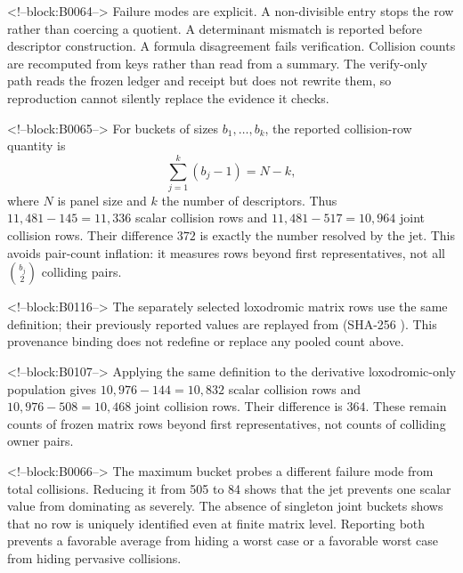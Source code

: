 \documentclass[11pt,a4paper]{article}
\theoremstyle{definition}
\theoremstyle{remark}
\begin{document}
<!--block:B0064-->
Failure modes are explicit. A non-divisible entry stops the row rather than coercing a quotient. A determinant mismatch is reported before descriptor construction. A formula disagreement fails verification. Collision counts are recomputed from keys rather than read from a summary. The verify-only path reads the frozen ledger and receipt but does not rewrite them, so reproduction cannot silently replace the evidence it checks.

<!--block:B0065-->
For buckets of sizes \(b_1,\ldots,b_k\), the reported collision-row quantity is
\[
 \sum_{j=1}^k(b_j-1)=N-k,
\]
where \(N\) is panel size and \(k\) the number of descriptors. Thus \(11{,}481-145=11{,}336\) scalar collision rows and \(11{,}481-517=10{,}964\) joint collision rows. Their difference \(372\) is exactly the number resolved by the jet. This avoids pair-count inflation: it measures rows beyond first representatives, not all \(\binom{b_j}{2}\) colliding pairs.

<!--block:B0116-->
The separately selected loxodromic matrix rows use the same definition; their previously reported values are replayed from  (SHA-256 ). This provenance binding does not redefine or replace any pooled count above.

<!--block:B0107-->
Applying the same definition to the derivative loxodromic-only population gives \(10{,}976-144=10{,}832\) scalar collision rows and \(10{,}976-508=10{,}468\) joint collision rows. Their difference is \(364\). These remain counts of frozen matrix rows beyond first representatives, not counts of colliding owner pairs.

<!--block:B0066-->
The maximum bucket probes a different failure mode from total collisions. Reducing it from 505 to 84 shows that the jet prevents one scalar value from dominating as severely. The absence of singleton joint buckets shows that no row is uniquely identified even at finite matrix level. Reporting both prevents a favorable average from hiding a worst case or a favorable worst case from hiding pervasive collisions.
\end{document}
